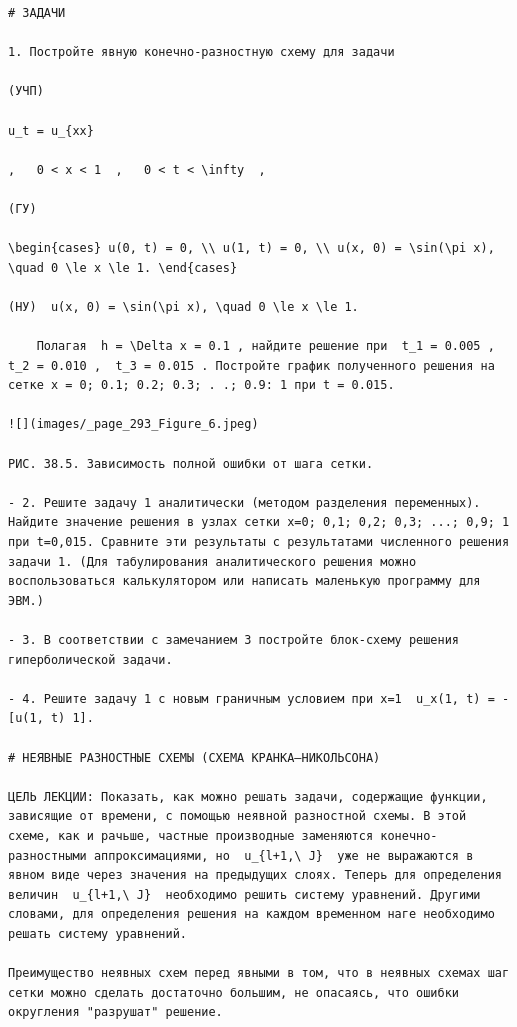\documentclass[
  ukrainian,
]{article}
\begin{document}
\begin{verbatim}
# ЗАДАЧИ

1. Постройте явную конечно-разностную схему для задачи

(УЧП)

u_t = u_{xx}

,   0 < x < 1  ,   0 < t < \infty  ,

(ГУ)

\begin{cases} u(0, t) = 0, \\ u(1, t) = 0, \\ u(x, 0) = \sin(\pi x), \quad 0 \le x \le 1. \end{cases}

(HУ)  u(x, 0) = \sin(\pi x), \quad 0 \le x \le 1.

    Полагая  h = \Delta x = 0.1 , найдите решение при  t_1 = 0.005 ,  t_2 = 0.010 ,  t_3 = 0.015 . Постройте график полученного решения на сетке x = 0; 0.1; 0.2; 0.3; . .; 0.9: 1 при t = 0.015.

![](images/_page_293_Figure_6.jpeg)

РИС. 38.5. Зависимость полной ошибки от шага сетки.

- 2. Решите задачу 1 аналитически (методом разделения переменных). Найдите значение решения в узлах сетки x=0; 0,1; 0,2; 0,3; ...; 0,9; 1 при t=0,015. Сравните эти результаты с результатами численного решения задачи 1. (Для табулирования аналитического решения можно воспользоваться калькулятором или написать маленькую программу для ЭВМ.)

- 3. В соответствии с замечанием 3 постройте блок-схему решения гиперболической задачи.

- 4. Решите задачу 1 с новым граничным условием при x=1  u_x(1, t) = -[u(1, t) 1].

# НЕЯВНЫЕ РАЗНОСТНЫЕ СХЕМЫ (СХЕМА КРАНКА—НИКОЛЬСОНА)

ЦЕЛЬ ЛЕКЦИИ: Показать, как можно решать задачи, содержащие функции, зависящие от времени, с помощью неявной разностной схемы. В этой схеме, как и рачьше, частные производные заменяются конечно-разностными аппроксимациями, но  u_{l+1,\ J}  уже не выражаются в явном виде через значения на предыдущих слоях. Теперь для определения величин  u_{l+1,\ J}  необходимо решить систему уравнений. Другими словами, для определения решения на каждом временном наге необходимо решать систему уравнений.

Преимущество неявных схем перед явными в том, что в неявных схемах шаг сетки можно сделать достаточно большим, не опасаясь, что ошибки округления "разрушат" решение.


\end{verbatim}
\end{document}
